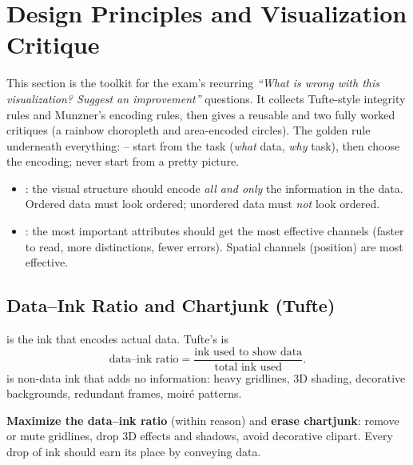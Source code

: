\section{Design Principles and Visualization Critique}

This section is the toolkit for the exam's recurring \emph{``What is wrong with
this visualization? Suggest an improvement''} questions. It collects
Tufte-style integrity rules and Munzner's encoding rules, then gives a reusable
 and two fully worked critiques (a rainbow choropleth
and area-encoded circles). The golden rule underneath everything:
 -- start from the task (\emph{what} data,
\emph{why} task), then choose the encoding; never start from a pretty picture.

\begin{keybox}
\begin{itemize}
  \item {}: the visual structure should encode
    \emph{all and only} the information in the data. Ordered data must look
    ordered; unordered data must \emph{not} look ordered.
  \item {}: the most important attributes should get the most
    effective channels (faster to read, more distinctions, fewer errors).
    Spatial channels (position) are most effective.
\end{itemize}
\end{keybox}

\subsection{Data--Ink Ratio and Chartjunk (Tufte)}

 is the ink that encodes actual data. Tufte's
 is
\[
  \text{data--ink ratio} = \frac{\text{ink used to show data}}
                                 {\text{total ink used}}.
\]
 is non-data ink that adds no information: heavy gridlines,
3D shading, decorative backgrounds, redundant frames, moir\'e patterns.

\begin{keybox}[Rules]
\textbf{Maximize the data--ink ratio} (within reason) and \textbf{erase
chartjunk}: remove or mute gridlines, drop 3D effects and shadows, avoid
decorative clipart. Every drop of ink should earn its place by conveying data.
\end{keybox}

